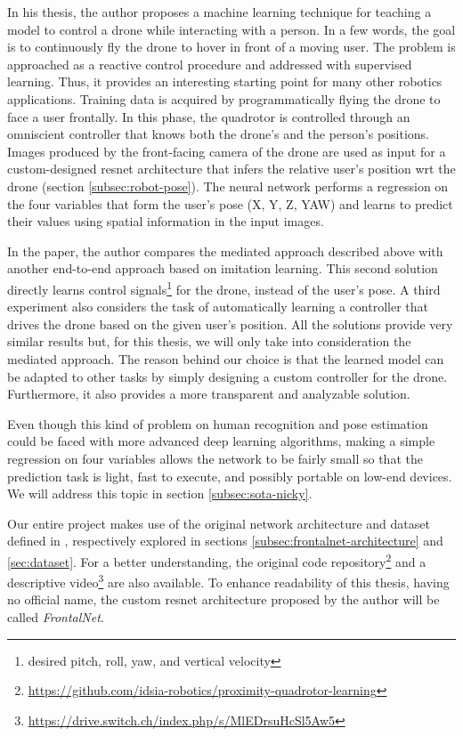 In his thesis, the author proposes a machine learning technique for teaching a model to control a drone while interacting with a person. In a few words, the goal is to continuously fly the drone to hover in front of a moving user. The problem is approached as a reactive control procedure and addressed with supervised learning. Thus, it provides an interesting starting point for many other robotics applications. Training data is acquired by programmatically flying the drone to face a user frontally. In this phase, the quadrotor is controlled through an omniscient controller that knows both the drone's and the person's positions. Images produced by the front-facing camera of the drone are used as input for a custom-designed \gls{resnet} architecture that infers the relative user's position \gls{wrt} the drone (section \ref{subsec:robot-pose}). The neural network performs a regression on the four variables that form the user's pose (X, Y, Z, YAW) and learns to predict their values using spatial information in the input images.

In the paper, the author compares the mediated approach described above with another end-to-end approach based on imitation learning. This second solution directly learns control signals\footnote{desired pitch, roll, yaw, and vertical velocity} for the drone, instead of the user's pose. A third experiment also considers the task of automatically learning a controller that drives the drone based on the given user's position. All the solutions provide very similar results but, for this thesis, we will only take into consideration the mediated approach. The reason behind our choice is that the learned model can be adapted to other tasks by simply designing a custom controller for the drone. Furthermore, it also provides a more transparent and analyzable solution.

Even though this kind of problem on human recognition and pose estimation could be faced with more advanced deep learning algorithms, making a simple regression on four variables allows the network to be fairly small so that the prediction task is light, fast to execute, and possibly portable on low-end devices. We will address this topic in section \ref{subsec:sota-nicky}.

\medskip

Our entire project makes use of the original network architecture and dataset defined in \cite{mantegazza2019visionbased}, respectively explored in sections \ref{subsec:frontalnet-architecture} and \ref{sec:dataset}. For a better understanding, the original code repository\footnote{\url{https://github.com/idsia-robotics/proximity-quadrotor-learning}} and a descriptive video\footnote{\url{https://drive.switch.ch/index.php/s/MlEDrsuHcSl5Aw5}} are also available. To enhance readability of this thesis, having no official name, the custom \gls{resnet} architecture proposed by the author will be called \textit{FrontalNet}.



